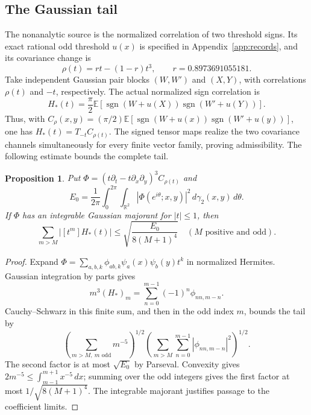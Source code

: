 \documentclass[11pt]{article}
\newtheorem{proposition}{Proposition}
\newcommand{\E}{\mathbb E}
\newcommand{\R}{\mathbb R}
\begin{document}
\subsection{The Gaussian tail}
The nonanalytic source is the normalized correlation of two threshold signs. Its exact rational odd threshold $u(x)$ is specified in Appendix~\ref{app:records}, and its covariance change is
\begin{equation*}
 \rho(t)=rt-(1-r)t^3,
 \qquad r=0.8973691055181.
\end{equation*}
Take independent Gaussian pair blocks $(W,W')$ and $(X,Y)$, with correlations $\rho(t)$ and $-t$, respectively. The actual normalized sign correlation is
\begin{equation}\label{eq:actual-signs}
 H_*(t)=\frac\pi2\E[\operatorname{sgn}(W+u(X))
                    \operatorname{sgn}(W'+u(Y))].
\end{equation}
Thus, with $C_\rho(x,y)=(\pi/2)\E[\operatorname{sgn}(W+u(x))\operatorname{sgn}(W'+u(y))]$, one has $H_*(t)=T_{-t}C_{\rho(t)}$. The signed tensor maps realize the two covariance channels simultaneously for every finite vector family, proving admissibility. The following estimate bounds the complete tail.

\begin{proposition}\label{prop:gaussian-tail}
Put $\Phi=(t\partial_t-t\partial_x\partial_y)^3C_{\rho(t)}$ and
\begin{equation}\label{eq:energy}
 E_0=\frac1{2\pi}\int_0^{2\pi}\int_{\R^2}
 |\Phi(e^{i\theta};x,y)|^2\,d\gamma_2(x,y)\,d\theta.
\end{equation}
If $\Phi$ has an integrable Gaussian majorant for $|t|\le1$, then
\begin{equation}\label{eq:c3-tail}
 \sum_{m>M}|[t^m]H_*(t)|
 \le\sqrt{\frac{E_0}{8(M+1)^4}}
 \quad(M\text{ positive and odd}).
\end{equation}
\end{proposition}
\begin{proof}
Expand $\Phi=\sum_{a,b,k}\phi_{ab,k}\psi_a(x)\psi_b(y)t^k$ in normalized Hermites. Gaussian integration by parts gives
\begin{equation*}
 m^3(H_*)_m=\sum_{n=0}^{m-1}(-1)^n\phi_{nn,m-n}.
\end{equation*}
Cauchy--Schwarz in this finite sum, and then in the odd index $m$, bounds the tail by
\begin{equation*}
 \left(\sum_{m>M,\ m\text{ odd}}m^{-5}\right)^{1/2}
 \left(\sum_{m>M}\sum_{n=0}^{m-1}|\phi_{nn,m-n}|^2\right)^{1/2}.
\end{equation*}
The second factor is at most $\sqrt{E_0}$ by Parseval. Convexity gives $2m^{-5}\le\int_{m-1}^{m+1}x^{-5}\,dx$; summing over the odd integers gives the first factor at most $1/\sqrt{8(M+1)^4}$. The integrable majorant justifies passage to the coefficient limits.
\end{proof}
\end{document}

